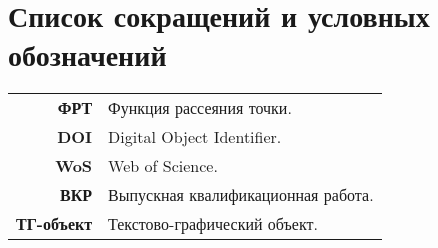 \chapter*{Список сокращений и условных обозначений}             %
\noindent
\addtocounter{table}{-1}%

\begin{tabular*}{\textwidth}{rl} %
\textbf{ФРТ} & Функция рассеяния точки. \\
\textbf{DOI} & Digital Object Identifier. \\
\textbf{WoS} & Web of Science. \\
\textbf{ВКР}  & Выпускная квалификационная работа. \\
\textbf{ТГ-объект}  & Текстово-графический объект. \\
%

\end{tabular*}
